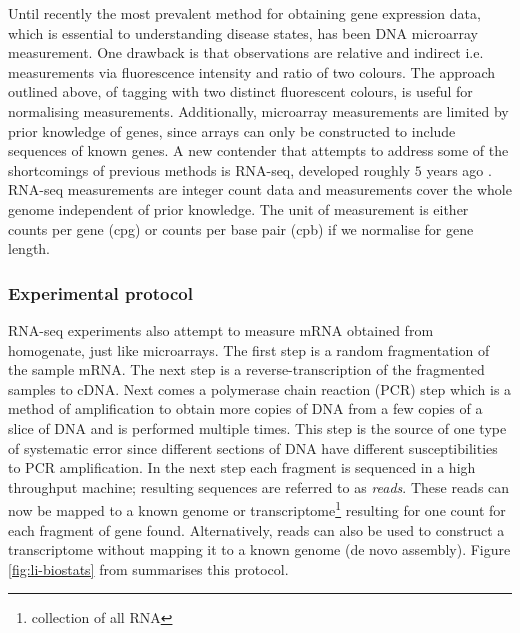 Until recently the most prevalent method for obtaining gene expression data, which is essential to understanding disease states, has been DNA microarray measurement. One drawback is that observations are relative and indirect i.e. measurements via fluorescence intensity and ratio of two colours. The approach outlined above, of tagging with two distinct fluorescent colours, is useful for normalising measurements. Additionally, microarray measurements are limited by prior knowledge of genes, since arrays can only be constructed to include sequences of known genes. A new contender that attempts to address some of the shortcomings of previous methods is RNA-seq, developed roughly $5$ years ago \citep{Mortazavi:2008jj, Nagalakshmi:2008cj}. RNA-seq measurements are integer count data and measurements cover the whole genome independent of prior knowledge. The unit of measurement is either counts per gene (cpg) or counts per base pair (cpb) if we normalise for gene length.

\subsubsection{Experimental protocol}
\label{sec:technique-bio}

RNA-seq experiments also attempt to measure mRNA obtained from homogenate, just like microarrays. The first step is a random fragmentation of the sample mRNA. The next step is a reverse-transcription of the fragmented samples to cDNA. Next comes a polymerase chain reaction (PCR) step which is a method of amplification to obtain more copies of DNA from a few copies of a slice of DNA and is performed multiple times. This step is the source of one type of systematic error since different sections of  DNA have different susceptibilities to PCR amplification. In the next step each fragment is sequenced in a high throughput machine; resulting sequences are referred to as \emph{reads}. These reads can now be mapped to a known genome or transcriptome\footnote{collection of all RNA} resulting for one count for each fragment of gene found.  Alternatively, reads can also be used to construct a transcriptome without mapping it to a known genome (de novo assembly). Figure \ref{fig:li-biostats} from \cite{Li:2012ea} summarises this protocol.

